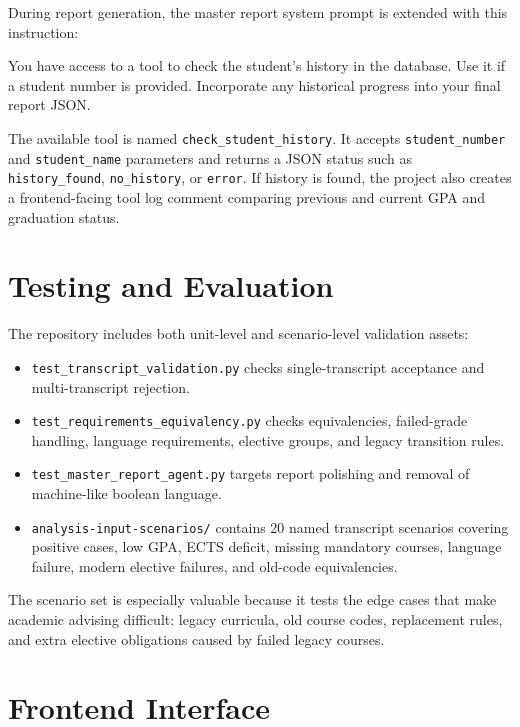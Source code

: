 \documentclass[11pt,a4paper]{article}
\begin{document}
During report generation, the master report system prompt is extended with this
instruction:

\begin{Prompt}
You have access to a tool to check the student's history in the database. Use it if a student number is provided. Incorporate any historical progress into your final report JSON.
\end{Prompt}

The available tool is named \texttt{check\_student\_history}. It accepts
\texttt{student\_number} and \texttt{student\_name} parameters and returns a JSON
status such as \texttt{history\_found}, \texttt{no\_history}, or
\texttt{error}. If history is found, the project also creates a frontend-facing
tool log comment comparing previous and current GPA and graduation status.

\section{Testing and Evaluation}

The repository includes both unit-level and scenario-level validation assets:

\begin{itemize}
  \item \texttt{test\_transcript\_validation.py} checks single-transcript
  acceptance and multi-transcript rejection.
  \item \texttt{test\_requirements\_equivalency.py} checks equivalencies,
  failed-grade handling, language requirements, elective groups, and legacy
  transition rules.
  \item \texttt{test\_master\_report\_agent.py} targets report polishing and
  removal of machine-like boolean language.
  \item \texttt{analysis-input-scenarios/} contains 20 named transcript
  scenarios covering positive cases, low GPA, ECTS deficit, missing mandatory
  courses, language failure, modern elective failures, and old-code
  equivalencies.
\end{itemize}

The scenario set is especially valuable because it tests the edge cases that
make academic advising difficult: legacy curricula, old course codes,
replacement rules, and extra elective obligations caused by failed legacy
courses.

\section{Frontend Interface}
\end{document}
